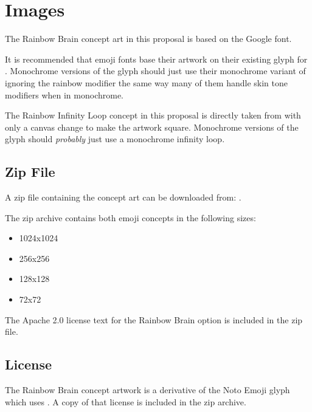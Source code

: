 \section{Images}

The Rainbow Brain concept art in this proposal is based on the Google\textsuperscript{\textregistered}
 font.

It is recommended that emoji fonts base their artwork on their existing glyph for
\brainemoji{}. Monochrome versions of the glyph should just use their
monochrome variant of \brainemoji{} ignoring the rainbow modifier the
same way many of them handle skin tone modifiers when in monochrome.

The Rainbow Infinity Loop concept in this proposal is directly taken from
with only a canvas change to make the artwork square. Monochrome versions of the glyph
should \emph{probably} just use a monochrome infinity loop.

\subsection{Zip File}
A zip file containing the concept art can be downloaded from:
.

The zip archive contains both emoji concepts in the following sizes:

\begin{itemize}
\item 1024x1024
\item 256x256
\item 128x128
\item 72x72
\end{itemize}

The Apache 2.0 license text for the Rainbow Brain option is included in the zip file.

\subsection{License}

The Rainbow Brain concept artwork is a derivative of the Noto Emoji \brainemoji{} glyph
which uses .
A copy of that license is included in the zip archive.


